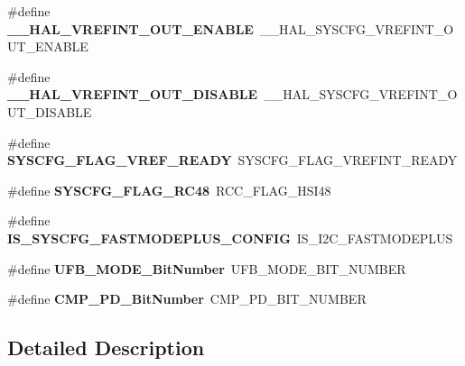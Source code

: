 \begin{DoxyCompactItemize}
\#define {\bfseries \+\_\+\+\_\+\+H\+A\+L\+\_\+\+V\+R\+E\+F\+I\+N\+T\+\_\+\+O\+U\+T\+\_\+\+E\+N\+A\+B\+LE}~\+\_\+\+\_\+\+H\+A\+L\+\_\+\+S\+Y\+S\+C\+F\+G\+\_\+\+V\+R\+E\+F\+I\+N\+T\+\_\+\+O\+U\+T\+\_\+\+E\+N\+A\+B\+LE
\item 
\mbox{\label{group___h_a_l___aliased___macros_ga8ef2904e9bea234864ed664771aeed49}} 
\#define {\bfseries \+\_\+\+\_\+\+H\+A\+L\+\_\+\+V\+R\+E\+F\+I\+N\+T\+\_\+\+O\+U\+T\+\_\+\+D\+I\+S\+A\+B\+LE}~\+\_\+\+\_\+\+H\+A\+L\+\_\+\+S\+Y\+S\+C\+F\+G\+\_\+\+V\+R\+E\+F\+I\+N\+T\+\_\+\+O\+U\+T\+\_\+\+D\+I\+S\+A\+B\+LE
\item 
\mbox{\label{group___h_a_l___aliased___macros_ga2978f132138676255e533e6f18fbe5df}} 
\#define {\bfseries S\+Y\+S\+C\+F\+G\+\_\+\+F\+L\+A\+G\+\_\+\+V\+R\+E\+F\+\_\+\+R\+E\+A\+DY}~S\+Y\+S\+C\+F\+G\+\_\+\+F\+L\+A\+G\+\_\+\+V\+R\+E\+F\+I\+N\+T\+\_\+\+R\+E\+A\+DY
\item 
\mbox{\label{group___h_a_l___aliased___macros_gaaf8b670b9f5fdd39553af1637189456c}} 
\#define {\bfseries S\+Y\+S\+C\+F\+G\+\_\+\+F\+L\+A\+G\+\_\+\+R\+C48}~R\+C\+C\+\_\+\+F\+L\+A\+G\+\_\+\+H\+S\+I48
\item 
\mbox{\label{group___h_a_l___aliased___macros_ga57549e7341a90913bac75a34768b9562}} 
\#define {\bfseries I\+S\+\_\+\+S\+Y\+S\+C\+F\+G\+\_\+\+F\+A\+S\+T\+M\+O\+D\+E\+P\+L\+U\+S\+\_\+\+C\+O\+N\+F\+IG}~I\+S\+\_\+\+I2\+C\+\_\+\+F\+A\+S\+T\+M\+O\+D\+E\+P\+L\+US
\item 
\mbox{\label{group___h_a_l___aliased___macros_gaa531b9c8535235ee73455c2b88663c03}} 
\#define {\bfseries U\+F\+B\+\_\+\+M\+O\+D\+E\+\_\+\+Bit\+Number}~U\+F\+B\+\_\+\+M\+O\+D\+E\+\_\+\+B\+I\+T\+\_\+\+N\+U\+M\+B\+ER
\item 
\mbox{\label{group___h_a_l___aliased___macros_ga0ca336e48ea4840c7d1cde05a0e07e82}} 
\#define {\bfseries C\+M\+P\+\_\+\+P\+D\+\_\+\+Bit\+Number}~C\+M\+P\+\_\+\+P\+D\+\_\+\+B\+I\+T\+\_\+\+N\+U\+M\+B\+ER
\end{DoxyCompactItemize}


\subsection{Detailed Description}
